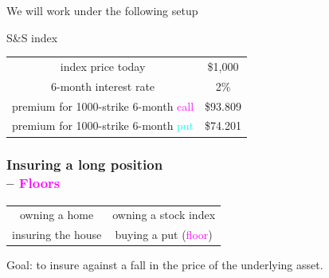 \begin{frame}[fragile,t]
\begin{center}
	We will work under the following setup
	\bigskip
	\bigskip

	S\&S index\\
	\bigskip

	\renewcommand{\arraystretch}{1.2}
	\begin{tabular}{|c|c|}
		\hline
		index price today                                         & \$1,000  \\
    6-month interest rate                                     & 2\%      \\
		premium for 1000-strike 6-month \textcolor{magenta}{call} & \$93.809 \\
		premium for 1000-strike 6-month \textcolor{cyan}{put}     & \$74.201 \\ \hline
	\end{tabular}

\end{center}

\end{frame}
\begin{frame}[fragile]
	\frametitle{Insuring a long position \\ -- \textcolor{magenta}{Floors}}

	\begin{center}
		\renewcommand{\arraystretch}{1.2}
		\begin{tabular}{|c|c|}
			owning a home      & owning a stock index                      \\
			insuring the house & buying a put (\textcolor{magenta}{floor}) \\
		\end{tabular}
		\bigskip
		\bigskip

		Goal: to insure against a fall in the price of the underlying asset.
	\end{center}

\end{frame}
